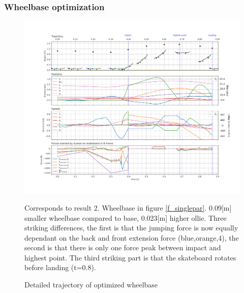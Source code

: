 \documentclass[default,iicol]{sn-jnl}
\begin{document}
{\subsubsection{Wheelbase optimization}
\begin{figure}
    \centering
    \includegraphics[trim={0cm 0cm 0cm 0cm},clip,width=\textwidth]{figure/Results/data_l_wbdpi600.png}    \vspace{-1cm}\caption[Trajectory, positions, speeds, and forces for wheelbase optimization]{Detailed trajectory of optimized wheelbase}\label{f_wheelbase}
    Corresponds to result 2. Wheelbase in figure \ref{f_singlepar}. 0.09[m] smaller wheelbase compared to base, 0.023[m] higher ollie. Three striking differences, the first is that the jumping force is now equally dependant on the back and front extension force (blue,orange,4), the second is that there is only one force peak between impact and highest point. The third striking part is that the skateboard rotates before landing (t=0.8).
\end{figure}
}
\end{document}

